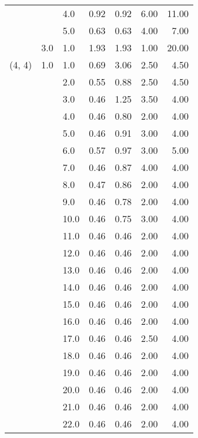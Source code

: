 \begin{tabular}{lllrrrr}
       &     & 4.0  &       0.92 &      0.92 & 6.00 &  11.00 \\
       &     & 5.0  &       0.63 &      0.63 & 4.00 &   7.00 \\
       & 3.0 & 1.0  &       1.93 &      1.93 & 1.00 &  20.00 \\
(4, 4) & 1.0 & 1.0  &       0.69 &      3.06 & 2.50 &   4.50 \\
       &     & 2.0  &       0.55 &      0.88 & 2.50 &   4.50 \\
       &     & 3.0  &       0.46 &      1.25 & 3.50 &   4.00 \\
       &     & 4.0  &       0.46 &      0.80 & 2.00 &   4.00 \\
       &     & 5.0  &       0.46 &      0.91 & 3.00 &   4.00 \\
       &     & 6.0  &       0.57 &      0.97 & 3.00 &   5.00 \\
       &     & 7.0  &       0.46 &      0.87 & 4.00 &   4.00 \\
       &     & 8.0  &       0.47 &      0.86 & 2.00 &   4.00 \\
       &     & 9.0  &       0.46 &      0.78 & 2.00 &   4.00 \\
       &     & 10.0 &       0.46 &      0.75 & 3.00 &   4.00 \\
       &     & 11.0 &       0.46 &      0.46 & 2.00 &   4.00 \\
       &     & 12.0 &       0.46 &      0.46 & 2.00 &   4.00 \\
       &     & 13.0 &       0.46 &      0.46 & 2.00 &   4.00 \\
       &     & 14.0 &       0.46 &      0.46 & 2.00 &   4.00 \\
       &     & 15.0 &       0.46 &      0.46 & 2.00 &   4.00 \\
       &     & 16.0 &       0.46 &      0.46 & 2.00 &   4.00 \\
       &     & 17.0 &       0.46 &      0.46 & 2.50 &   4.00 \\
       &     & 18.0 &       0.46 &      0.46 & 2.00 &   4.00 \\
       &     & 19.0 &       0.46 &      0.46 & 2.00 &   4.00 \\
       &     & 20.0 &       0.46 &      0.46 & 2.00 &   4.00 \\
       &     & 21.0 &       0.46 &      0.46 & 2.00 &   4.00 \\
       &     & 22.0 &       0.46 &      0.46 & 2.00 &   4.00 \\

\end{tabular}
